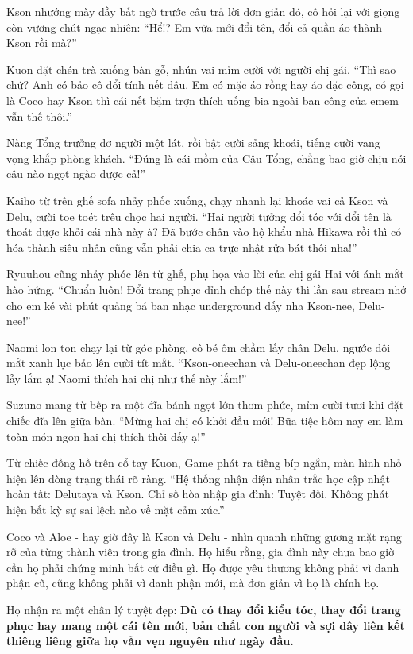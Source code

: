 ﻿\documentclass[../main.tex]{subfiles}
\begin{document}
Kson nhướng mày đầy bất ngờ trước câu trả lời đơn giản đó, cô hỏi lại với giọng còn vương chút ngạc nhiên: ``Hể!? Em vừa mới đổi tên, đổi cả quần áo thành Kson rồi mà?''

Kuon đặt chén trà xuống bàn gỗ, nhún vai mỉm cười với người chị gái. ``Thì sao chứ? Anh có bảo cô đổi tính nết đâu. Em có mặc áo rồng hay áo đặc công, có gọi là Coco hay Kson thì cái nết bặm trợn thích uống bia ngoài ban công của emem vẫn thế thôi.''

Nàng Tổng trưởng đơ người một lát, rồi bật cười sảng khoái, tiếng cười vang vọng khắp phòng khách. ``Đúng là cái mồm của Cậu Tổng, chẳng bao giờ chịu nói câu nào ngọt ngào được cả!''

Kaiho từ trên ghế sofa nhảy phốc xuống, chạy nhanh lại khoác vai cả Kson và Delu, cười toe toét trêu chọc hai người. ``Hai người tưởng đổi tóc với đổi tên là thoát được khỏi cái nhà này à? Đã bước chân vào hộ khẩu nhà Hikawa rồi thì có hóa thành siêu nhân cũng vẫn phải chia ca trực nhật rửa bát thôi nha!''

Ryuuhou cũng nhảy phóc lên từ ghế, phụ họa vào lời của chị gái Hai với ánh mắt hào hứng. ``Chuẩn luôn! Đổi trang phục đỉnh chóp thế này thì lần sau stream nhớ cho em ké vài phút quảng bá ban nhạc underground đấy nha Kson-nee, Delu-nee!''

Naomi lon ton chạy lại từ góc phòng, cô bé ôm chầm lấy chân Delu, ngước đôi mắt xanh lục bảo lên cười tít mắt. ``Kson-oneechan và Delu-oneechan đẹp lộng lẫy lắm ạ! Naomi thích hai chị như thế này lắm!''

Suzuno mang từ bếp ra một đĩa bánh ngọt lớn thơm phức, mỉm cười tươi khi đặt chiếc đĩa lên giữa bàn. ``Mừng hai chị có khởi đầu mới! Bữa tiệc hôm nay em làm toàn món ngon hai chị thích thôi đấy ạ!''

Từ chiếc đồng hồ trên cổ tay Kuon, Game phát ra tiếng bíp ngắn, màn hình nhỏ hiện lên dòng trạng thái rõ ràng. ``Hệ thống nhận diện nhân trắc học cập nhật hoàn tất: Delutaya và Kson. Chỉ số hòa nhập gia đình: Tuyệt đối. Không phát hiện bất kỳ sự sai lệch nào về mặt cảm xúc.''

Coco và Aloe - hay giờ đây là Kson và Delu - nhìn quanh những gương mặt rạng rỡ của từng thành viên trong gia đình. Họ hiểu rằng, gia đình này chưa bao giờ cần họ phải chứng minh bất cứ điều gì. Họ được yêu thương không phải vì danh phận cũ, cũng không phải vì danh phận mới, mà đơn giản vì họ là chính họ.

Họ nhận ra một chân lý tuyệt đẹp: \textbf{Dù có thay đổi kiểu tóc, thay đổi trang phục hay mang một cái tên mới, bản chất con người và sợi dây liên kết thiêng liêng giữa họ vẫn vẹn nguyên như ngày đầu.}
\end{document}
